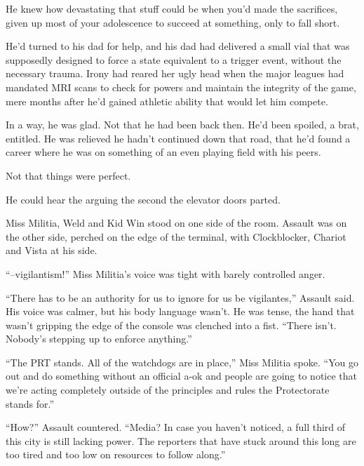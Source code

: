 He knew how devastating that stuff could be when you'd made the sacrifices, given up most of your adolescence to succeed at something, only to fall short.



He'd turned to his dad for help, and his dad had delivered a small vial that was supposedly designed to force a state equivalent to a trigger event, without the necessary trauma.  Irony had reared her ugly head when the major leagues had mandated MRI scans to check for powers and maintain the integrity of the game, mere months after he'd gained athletic ability that would let him compete.



In a way, he was glad.  Not that he had been back then.  He'd been spoiled, a brat, entitled.  He was relieved he hadn't continued down that road, that he'd found a career where he was on something of an even playing field with his peers.



Not that things were perfect.



He could hear the arguing the second the elevator doors parted.



Miss Militia, Weld and Kid Win stood on one side of the room.  Assault was on the other side, perched on the edge of the terminal, with Clockblocker, Chariot and Vista at his side.



``--vigilantism!''  Miss Militia's voice was tight with barely controlled anger.



``There has to be an authority for us to ignore for us be vigilantes,'' Assault said.  His voice was calmer, but his body language wasn't.  He was tense, the hand that wasn't gripping the edge of the console was clenched into a fist.  ``There isn't.  Nobody's stepping up to enforce anything.''



``The PRT stands.  All of the watchdogs are in place,'' Miss Militia spoke.  ``You go out and do something without an official a-ok and people are going to notice that we're acting completely outside of the principles and rules the Protectorate stands for.''



``How?'' Assault countered.  ``Media?  In case you haven't noticed, a full third of this city is still lacking power.  The reporters that have stuck around this long are too tired and too low on resources to follow along.''



